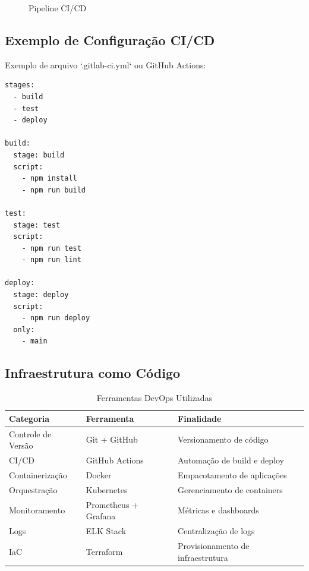 \documentclass[11pt,a4paper]{article}
\begin{document}
\begin{figure}[H]
\centering
{}
\caption{Pipeline CI/CD}
\label{fig:cicd}
\end{figure}

\subsection{Exemplo de Configuração CI/CD}

Exemplo de arquivo `.gitlab-ci.yml` ou GitHub Actions:

\begin{verbatim}
stages:
  - build
  - test
  - deploy

build:
  stage: build
  script:
    - npm install
    - npm run build

test:
  stage: test
  script:
    - npm run test
    - npm run lint

deploy:
  stage: deploy
  script:
    - npm run deploy
  only:
    - main
\end{verbatim}

\subsection{Infraestrutura como Código}

\begin{table}[H]
\centering
\caption{Ferramentas DevOps Utilizadas}
\label{tab:devops-tools}
\begin{tabular}{|l|l|p{6cm}|}
\hline
\textbf{Categoria} & \textbf{Ferramenta} & \textbf{Finalidade} \\
\hline
Controle de Versão & Git + GitHub & Versionamento de código \\
CI/CD & GitHub Actions & Automação de build e deploy \\
Containerização & Docker & Empacotamento de aplicações \\
Orquestração & Kubernetes & Gerenciamento de containers \\
Monitoramento & Prometheus + Grafana & Métricas e dashboards \\
Logs & ELK Stack & Centralização de logs \\
IaC & Terraform & Provisionamento de infraestrutura \\
\hline
\end{tabular}
\end{table}
\end{document}
